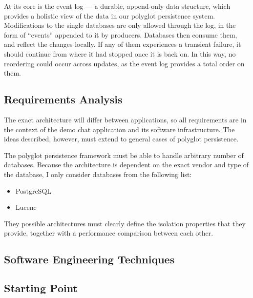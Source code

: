 \documentclass[12pt]{article}
\begin{document}
At its core is the event log --- a durable, append-only data structure, which provides a holistic view of the data in our polyglot persistence system. Modifications to the single databases are only allowed through the log, in the form of ``events'' appended to it by producers. Databases then consume them, and reflect the changes locally. If any of them experiences a transient failure, it should continue from where it had stopped once it is back on. In this way, no reordering could occur across updates, as the event log provides a total order on them.

\subsection{Requirements Analysis}

The exact architecture will differ between applications, so all requirements are in the context of the demo chat application and its software infrastructure. The ideas described, however, must extend to general cases of polyglot persistence.

The polyglot persistence framework must be able to handle arbitrary number of databases. Because the architecture is dependent on the exact vendor and type of the database, I only consider databases from the following list:
\begin{itemize}
    \item PostgreSQL
    \item Lucene
\end{itemize}

They possible architectures must clearly define the isolation properties that they provide, together with a performance comparison between each other.

\subsection{Software Engineering Techniques}

\subsection{Starting Point}
\end{document}
